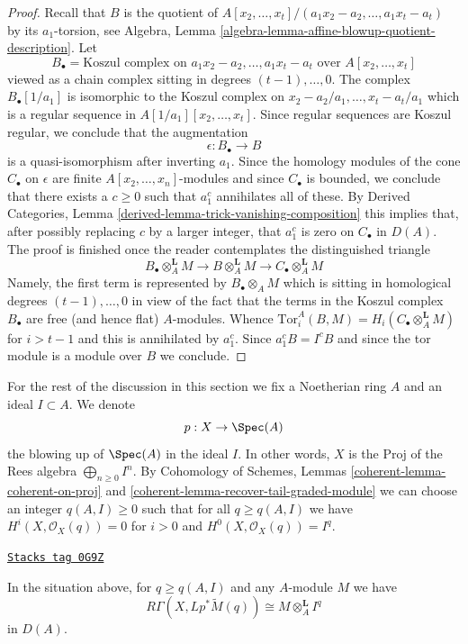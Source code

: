\begin{proof}
Recall that $B$ is the quotient of
$A[x_2, \ldots, x_t]/(a_1x_2 - a_2, \ldots, a_1x_t - a_t)$
by its $a_1$-torsion, see
Algebra, Lemma \ref{algebra-lemma-affine-blowup-quotient-description}. Let
$$
B_\bullet = \text{Koszul complex on }a_1x_2 - a_2, \ldots, a_1x_t - a_t
\text{ over }A[x_2, \ldots, x_t]
$$
viewed as a chain complex sitting in degrees $(t - 1), \ldots, 0$.
The complex $B_\bullet[1/a_1]$ is isomorphic to the Koszul complex
on $x_2 - a_2/a_1, \ldots, x_t - a_t/a_1$ which is a regular sequence
in $A[1/a_1][x_2, \ldots, x_t]$. Since regular sequences are
Koszul regular, we conclude that the augmentation
$$
\epsilon : B_\bullet \longrightarrow B
$$
is a quasi-isomorphism after inverting $a_1$. Since the homology modules
of the cone $C_\bullet$ on $\epsilon$ are finite $A[x_2, \ldots, x_n]$-modules
and since $C_\bullet$ is bounded,
we conclude that there exists a $c \geq 0$ such that $a_1^c$
annihilates all of these. By
Derived Categories, Lemma \ref{derived-lemma-trick-vanishing-composition}
this implies that, after possibly replacing $c$ by a larger integer,
that $a_1^c$ is zero on $C_\bullet$ in $D(A)$.
The proof is finished once the reader contemplates
the distinguished triangle
$$
B_\bullet \otimes_A^\mathbf{L} M \to
B \otimes_A^\mathbf{L} M \to
C_\bullet \otimes_A^\mathbf{L} M
$$
Namely, the first term is represented by $B_\bullet \otimes_A M$ which
is sitting in homological degrees $(t - 1), \ldots, 0$
in view of the fact that the terms in the Koszul complex $B_\bullet$
are free (and hence flat) $A$-modules. Whence
$\text{Tor}_i^A(B, M) = H_i(C_\bullet \otimes_A^\mathbf{L} M)$
for $i > t - 1$ and this is annihilated by $a_1^c$.
Since $a_1^cB = I^cB$ and since the tor module is a module
over $B$ we conclude.
\end{proof}

For the rest of the discussion in this section we fix a Noetherian ring $A$
and an ideal $I \subset A$. We denote
$$
p : X \to \Spec(A)
$$
the blowing up of $\Spec(A)$ in the ideal $I$. In other words, $X$ is the
$\text{Proj}$ of the Rees algebra $\bigoplus_{n \geq 0} I^n$.
By Cohomology of Schemes, Lemmas \ref{coherent-lemma-coherent-on-proj} and
\ref{coherent-lemma-recover-tail-graded-module}
we can choose an integer $q(A, I) \geq 0$ such that for all $q \geq q(A, I)$
we have $H^i(X, \mathcal{O}_X(q)) = 0$ for
$i > 0$ and $H^0(X, \mathcal{O}_X(q)) = I^q$.

\begin{lemma}
\label{local-cohomology-lemma-compute-tor-Iq}
\href{https://stacks.math.columbia.edu/tag/0G9Z}{\texttt{Stacks tag 0G9Z}}

In the situation above, for $q \geq q(A, I)$ and any $A$-module $M$ we have
$$
R\Gamma(X, Lp^*\widetilde{M}(q)) \cong M \otimes_A^\mathbf{L} I^q
$$
in $D(A)$.
\end{lemma}

